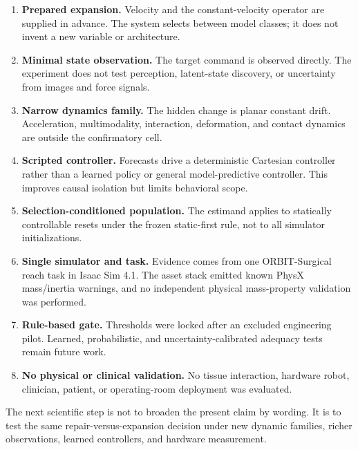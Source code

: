 \documentclass[10pt]{article}
\begin{document}
\begin{enumerate}[leftmargin=*]

\item \textbf{Prepared expansion.} Velocity and the constant-velocity operator are supplied in advance. The system selects between model classes; it does not invent a new variable or architecture.

\item \textbf{Minimal state observation.} The target command is observed directly. The experiment does not test perception, latent-state discovery, or uncertainty from images and force signals.

\item \textbf{Narrow dynamics family.} The hidden change is planar constant drift. Acceleration, multimodality, interaction, deformation, and contact dynamics are outside the confirmatory cell.

\item \textbf{Scripted controller.} Forecasts drive a deterministic Cartesian controller rather than a learned policy or general model-predictive controller. This improves causal isolation but limits behavioral scope.

\item \textbf{Selection-conditioned population.} The estimand applies to statically controllable resets under the frozen static-first rule, not to all simulator initializations.

\item \textbf{Single simulator and task.} Evidence comes from one ORBIT-Surgical reach task in Isaac Sim 4.1. The asset stack emitted known PhysX mass/inertia warnings, and no independent physical mass-property validation was performed.

\item \textbf{Rule-based gate.} Thresholds were locked after an excluded engineering pilot. Learned, probabilistic, and uncertainty-calibrated adequacy tests remain future work.

\item \textbf{No physical or clinical validation.} No tissue interaction, hardware robot, clinician, patient, or operating-room deployment was evaluated.

\end{enumerate}

The next scientific step is not to broaden the present claim by wording. It is to test the same repair-versus-expansion decision under new dynamic families, richer observations, learned controllers, and hardware measurement.
\end{document}
